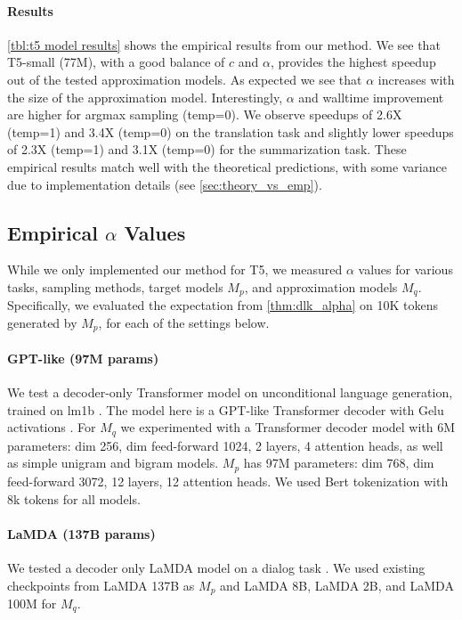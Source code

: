 \paragraph{Results}

\ref{tbl:t5 model results} shows the empirical results from our method. We see that T5-small (77M), with a good balance of $c$ and $\alpha$, provides the highest speedup out of the tested approximation models. As expected we see that $\alpha$ increases with the size of the approximation model. Interestingly, $\alpha$ and walltime improvement are higher for argmax sampling (temp=0). We observe speedups of 2.6X (temp=1) and 3.4X (temp=0) on the translation task and slightly lower speedups of 2.3X (temp=1) and 3.1X (temp=0) for the summarization task. These empirical results match well with the theoretical predictions, with some variance due to implementation details (see \ref{sec:theory_vs_emp}).

\subsection{Empirical $\alpha$ Values}
\label{sec:empirical_alphas}

While we only implemented our method for T5, we measured $\alpha$ values for various tasks, sampling methods, target models $M_p$, and approximation models $M_q$. Specifically, we evaluated the expectation from \ref{thm:dlk_alpha} on 10K tokens generated by $M_p$, for each of the settings below.

\paragraph{GPT-like (97M params)}We test a decoder-only Transformer model on unconditional language generation, trained on lm1b \citep{lm1b}. The model here is a GPT-like Transformer decoder with Gelu activations \citep{gelu}. For $M_q$ we experimented with a Transformer decoder model with 6M parameters: dim 256, dim feed-forward 1024, 2 layers, 4 attention heads, as well as simple unigram and bigram models. $M_p$ has 97M parameters: dim 768, dim feed-forward 3072, 12 layers, 12 attention heads. We used Bert tokenization \citep{bert} with 8k tokens for all models.

\paragraph{LaMDA (137B params)} We tested a decoder only LaMDA model on a dialog task \citep{lamda}. We used existing checkpoints from LaMDA 137B as $M_p$ and LaMDA 8B, LaMDA 2B, and LaMDA 100M for $M_q$.

